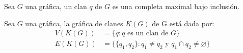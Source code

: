 \begin{Defi}[Clan]
Sea $G$ una gráfica, un clan $q$ de $G$ es una completa maximal bajo inclusión.
\end{Defi}

\begin{Defi}
Sea $G$ una gráfica, la gráfica de clanes $K(G)$ de G está dada por:
\begin{align*}
V(K(G))&=\{q: q \text{ es un clan de } G\} \\
E(K(G))&=\{\{q_1,q_2\}: q_1\neq q_2 \text{ y } q_1\cap q_2 \neq \varnothing \}
\end{align*}
\end{Defi}


